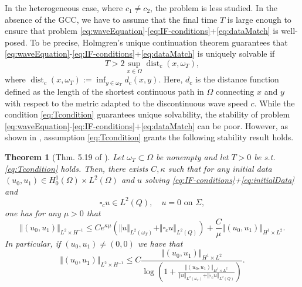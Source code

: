 \documentclass[sn-mathphys-num]{sn-jnl}
\newtheorem{thm}{Theorem}[section]
\numberwithin{equation}{section}
\newcommand{\wop}{\square_c}
\begin{document}
In the heterogeneous case, where $c_1 \not =  c_2$, the problem is less studied. In the absence of the GCC, we have to assume that the final time $T$ is large enough to ensure that problem \eqref{eq:waveEquation}-\eqref{eq:IF-conditions}+\eqref{eq:dataMatch} is well-posed. To be precise, Holmgren's unique continuation theorem guarantees that \eqref{eq:waveEquation}-\eqref{eq:IF-conditions}+\eqref{eq:dataMatch} is uniquely solvable if
\begin{equation}\label{eq:Tcondition}
    T > 2 \sup_{x \in \Omega} \operatorname{dist}_{c}(x,\omega_T),
\end{equation}
where $\operatorname{dist}_c(x,\omega_T) := \inf_{y \in \omega_T} d_c(x,y)$. Here, $d_c$ is the distance function defined as the length of the shortest continuous path in $\Omega$ connecting $x$ and $y$ with respect to the metric adapted to the discontinuous wave speed $c$. While the condition \eqref{eq:Tcondition} guarantees unique solvability, the stability of problem \eqref{eq:waveEquation}-\eqref{eq:IF-conditions}+\eqref{eq:dataMatch} can be poor. However, as shown in \cite[Thm. 5.19]{Filippas22}, assumption \eqref{eq:Tcondition} grants the following stability result holds. 

\begin{thm}[Thm. 5.19 of \cite{Filippas22}]\label{thm:filippas}
    Let $\omega_T \subset \Omega$ be nonempty and let $T > 0$ be s.t. \eqref{eq:Tcondition} holds. Then, there exists $C,\kappa$ such that for any initial data $(u_0,u_1) \in H^1_0(\Omega) \times L^2(\Omega)$ and $u$ solving \eqref{eq:IF-conditions}+\eqref{eq:initialData} and  
\[
\wop u \in L^2(Q), \quad u = 0 \text{ on } \Sigma,
\]
one has for any $\mu > 0$ that 
    \begin{equation}\label{eq:FilippasEstimate}
        \Vert (u_0,u_1) \Vert_{L^2 \times H^{-1}} \le C e^{\kappa \mu} \left( \Vert u \Vert_{L^2(\omega_T)} + \Vert \wop u \Vert_{L^2(Q)} \right) + \frac{C}{\mu} \Vert (u_0,u_1) \Vert_{H^1 \times L^2}. 
    \end{equation}
    In particular, if $(u_0,u_1) \not = (0,0)$ we have that 
    \begin{equation}\label{eq:FilippasEstimateLog}
        \Vert (u_0,u_1) \Vert_{L^2 \times H^{-1}} \le C \frac{\Vert (u_0,u_1) \Vert_{H^1 \times L^2}}{\log \left( 1 + \frac{\Vert (u_0,u_1) \Vert_{H^1 \times L^2}}{ \Vert u \Vert_{L^2(\omega_T)} + \Vert \wop u \Vert_{L^2(Q)}} \right)}. 
    \end{equation} 
\end{thm} 
\end{document}
